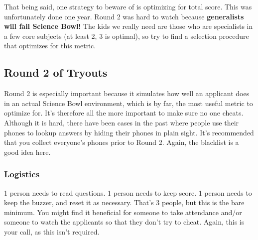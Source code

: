 \documentclass[11pt, letterpaper]{article}
\begin{document}
That being said, one strategy to beware of is optimizing for total score.
This was unfortunately done one year.
Round 2 was hard to watch because \textbf{generalists will fail Science Bowl!}
The kids we really need are those who are specialists in a few core subjects (at least 2, 3 is optimal), so try to find a selection procedure that optimizes for this metric.

\subsection{Round 2 of Tryouts}

Round 2 is especially important because it simulates how well an applicant does in an actual Science Bowl environment, which is by far, the most useful metric to optimize for.
It's therefore all the more important to make sure no one cheats.
Although it is hard, there have been cases in the past where people use their phones to lookup answers by hiding their phones in plain sight.
It's recommended that you collect everyone's phones prior to Round 2.
Again, the blacklist is a good idea here.

\subsubsection{Logistics}
1 person needs to read questions.
1 person needs to keep score.
1 person needs to keep the buzzer, and reset it as necessary.
That's 3 people, but this is the bare minimum.
You might find it beneficial for someone to take attendance and/or someone to watch the applicants so that they don't try to cheat.
Again, this is your call, as this isn't required.
\end{document}

